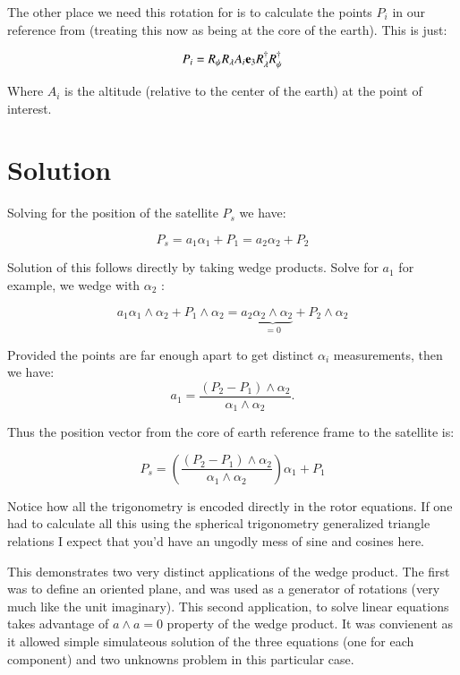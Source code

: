 \documentclass{article}      %
\begin{document}
The other place we need this rotation for is to calculate the points $P_i$ in our reference from (treating this now as being at the core of the earth).  This is just:

\begin{equation}
P_i = R_{\psi} R_{\lambda} A_i \mathbf{e}_3 R_{\lambda}^\dagger R_{\psi}^\dagger
\end{equation}

Where $A_i$ is the altitude (relative to the center of the earth) at the point of interest.

\section{ Solution }

Solving for the position of the satellite $P_s$ we have:

\[
P_s = a_1 \alpha_1 + P_1 = a_2 \alpha_2 + P_2
\]

Solution of this follows directly by taking wedge products.  Solve for $a_1$ for example, we wedge with $\alpha_2$ :

\[
a_1 \alpha_1 \wedge \alpha_2 + P_1 \wedge \alpha_2 = a_2 \underbrace{\alpha_2 \wedge \alpha_2}_{=0} + P_2 \wedge \alpha_2
\]

Provided the points are far enough apart to get distinct $\alpha_i$ measurements, then we have:
\[
a_1 = \frac{(P_2-P_1) \wedge \alpha_2}{ \alpha_1 \wedge \alpha_2 }.
\]

Thus the position vector from the core of earth reference frame to the satellite is:

\begin{equation}
P_s = \left(\frac{(P_2-P_1) \wedge \alpha_2}{ \alpha_1 \wedge \alpha_2 }\right) \alpha_1 + P_1
\end{equation}

Notice how all the trigonometry is encoded directly in the rotor equations.  If one had to calculate all this using the spherical trigonometry generalized triangle relations I expect that you'd have an ungodly mess of sine and cosines here.

This demonstrates two very distinct applications of the wedge product.  The first was to define an oriented plane, and was used as a generator of rotations (very much like the unit imaginary).  This second application, to solve linear equations takes advantage of $a \wedge a = 0$ property of the wedge product.  It was convienent as it allowed simple simulateous solution of the three equations (one for each component) and two unknowns problem in this particular case. 
\end{document}
